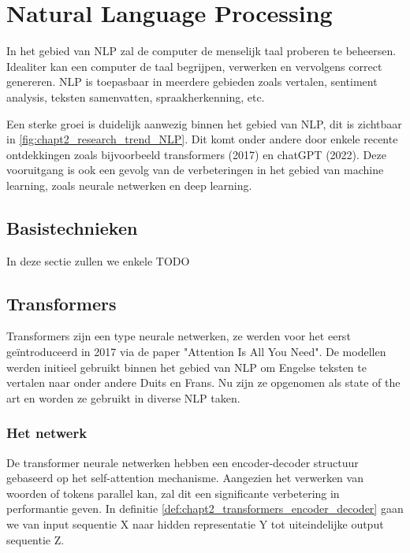\section{Natural Language Processing}
In het gebied van NLP zal de computer de menselijk taal proberen te beheersen. Idealiter  kan een computer de taal begrijpen, verwerken en vervolgens correct genereren. NLP is toepasbaar in meerdere gebieden zoals vertalen, sentiment analysis, teksten samenvatten, spraakherkenning, etc.


Een sterke groei is duidelijk aanwezig binnen het gebied van NLP, dit is zichtbaar in \autoref{fig:chapt2_research_trend_NLP}. Dit komt onder andere door enkele recente ontdekkingen zoals bijvoorbeeld transformers (2017) en chatGPT (2022). Deze vooruitgang is ook een gevolg van de verbeteringen in het gebied van machine learning, zoals neurale netwerken en deep learning.

\subsection{Basistechnieken}
In deze sectie zullen we enkele TODO

\subsection{Transformers}
Transformers zijn een type neurale netwerken, ze werden voor het eerst geïntroduceerd in 2017 via de paper "Attention Is All You Need"\cite{attention_is_all_you_need}.
De modellen werden initieel gebruikt binnen het gebied van NLP om Engelse teksten te vertalen naar onder andere Duits en Frans. Nu zijn ze opgenomen als state of the art en worden ze gebruikt in diverse NLP taken.


\subsubsection{Het netwerk}
De transformer neurale netwerken hebben een encoder-decoder structuur gebaseerd op het self-attention mechanisme. Aangezien het verwerken van woorden of tokens parallel kan, zal dit een significante verbetering in performantie geven. In definitie \ref{def:chapt2_transformers_encoder_decoder} gaan we van input sequentie X naar hidden representatie Y tot uiteindelijke output sequentie Z.

